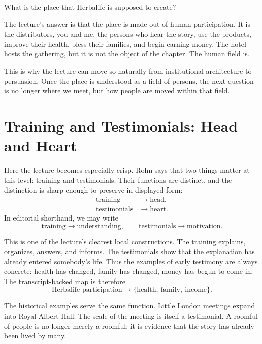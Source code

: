 What is the place that Herbalife is supposed to create?

The lecture's answer is that the place is made out of human participation. It is the distributors, you and me, the persons who hear the story, use the products, improve their health, bless their families, and begin earning money. The hotel hosts the gathering, but it is not the object of the chapter. The human field is.

This is why the lecture can move so naturally from institutional architecture to persuasion. Once the place is understood as a field of persons, the next question is no longer where we meet, but how people are moved within that field.

\section{Training and Testimonials: Head and Heart}

Here the lecture becomes especially crisp. Rohn says that two things matter at this level: training and testimonials. Their functions are distinct, and the distinction is sharp enough to preserve in displayed form:
\begin{align}
\text{training} &\to \text{head},\\
\text{testimonials} &\to \text{heart}.
\end{align}
In editorial shorthand, we may write
\begin{equation}
\text{training} \to \text{understanding}, \qquad
\text{testimonials} \to \text{motivation}.
\end{equation}

This is one of the lecture's clearest local constructions. The training explains, organizes, answers, and informs. The testimonials show that the explanation has already entered somebody's life. Thus the examples of early testimony are always concrete: health has changed, family has changed, money has begun to come in. The transcript-backed map is therefore
\begin{equation}
\text{Herbalife participation} \to \{\text{health},\ \text{family},\ \text{income}\}.
\end{equation}

The historical examples serve the same function. Little London meetings expand into Royal Albert Hall. The scale of the meeting is itself a testimonial. A roomful of people is no longer merely a roomful; it is evidence that the story has already been lived by many.


